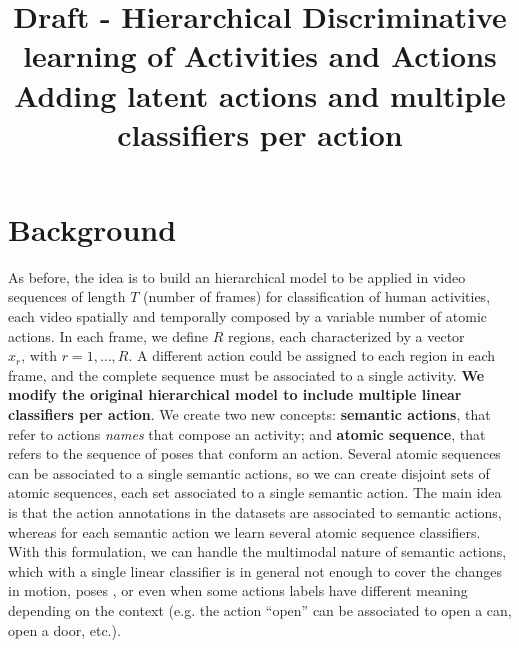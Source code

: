 \documentclass[10pt,letterpaper]{article}
\newcommand{\+}[1]{\ensuremath{{\boldsymbol #1}}}
\begin{document}
\title{Draft - Hierarchical Discriminative learning of Activities and Actions\\ Adding latent actions and multiple classifiers per action}


\maketitle

\section{Background}
As before, the idea is to build an hierarchical model to be applied in video sequences of length $T$ (number of frames)  for classification of human activities, each video spatially and temporally composed by a variable number of atomic actions. In each frame, we define $R$ regions, each characterized by a vector $x_r \text{, with } r=1,\dots,R$. A different action could be assigned to each region in each frame, and the complete sequence must be associated to a single activity. \textbf{We modify the original hierarchical model to include multiple linear classifiers per action}. We create two new concepts: \textbf{semantic actions}, that refer to actions \emph{names} that compose an activity; and \textbf{atomic sequence}, that refers to the sequence of poses that conform an action. Several atomic sequences can be associated to a single semantic actions, so we can create disjoint sets of atomic sequences, each set associated to a single semantic action.  The main idea is that the action annotations in the datasets are associated to semantic actions, whereas for each semantic action we learn several atomic sequence classifiers. With this formulation, we can handle the multimodal nature of semantic actions, which with a single linear classifier is in general not enough to cover the changes in motion, poses , or even when some actions labels have different meaning depending on the context (e.g. the action ``open'' can be associated to open a can, open a door, etc.).
\vspace{1em}
\end{document}
